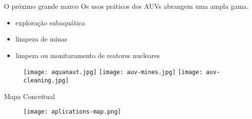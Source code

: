 
\begin{frame}[c]{O próximo grande marco}
    Os usos práticos dos AUVs abrangem uma ampla gama.
    \begin{itemize}
        \item exploração subaquática
        \item limpeza de minas
        \item limpeza ou monitaramento de reatores nucleares
    \end{itemize}

    \begin{figure}
        \texttt{[image: aquanaut.jpg]}
        \texttt{[image: auv-mines.jpg]}
        \texttt{[image: auv-cleaning.jpg]}
        \caption{\nocite{WatchMee87:online}}
        \caption{\nocite{Alookbac39:online}}
        \caption{\nocite{MeetAqua67:online}}
        \caption{\nocite{jain2015review}}
    \end{figure}
\end{frame}
\begin{frame}[c]{Mapa Conceitual}
        \begin{figure}
        \texttt{[image: aplications-map.png]}
    \end{figure}
\end{frame}
